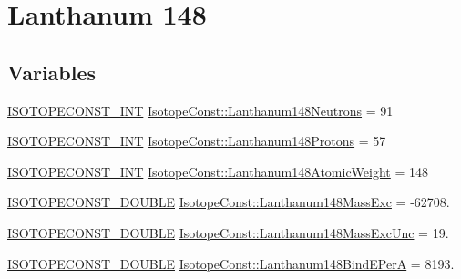 \hypertarget{group___isotope_const-_lanthanum-_la148}{}\section{Lanthanum 148}
\label{group___isotope_const-_lanthanum-_la148}
\subsection*{Variables}
\begin{DoxyCompactItemize}
\item 
\mbox{\hyperlink{group___isotope_const-_macros_ga5f18360b3e99483a35c32d789e62621c}{I\+S\+O\+T\+O\+P\+E\+C\+O\+N\+S\+T\+\_\+\+I\+NT}} \mbox{\hyperlink{group___isotope_const-_lanthanum-_la148_ga9b92a7258b10f0b59f1fd1bd5e867a75}{Isotope\+Const\+::\+Lanthanum148\+Neutrons}} = 91
\item 
\mbox{\hyperlink{group___isotope_const-_macros_ga5f18360b3e99483a35c32d789e62621c}{I\+S\+O\+T\+O\+P\+E\+C\+O\+N\+S\+T\+\_\+\+I\+NT}} \mbox{\hyperlink{group___isotope_const-_lanthanum-_la148_ga7ed66175a6c245f0605ebc61aa16052e}{Isotope\+Const\+::\+Lanthanum148\+Protons}} = 57
\item 
\mbox{\hyperlink{group___isotope_const-_macros_ga5f18360b3e99483a35c32d789e62621c}{I\+S\+O\+T\+O\+P\+E\+C\+O\+N\+S\+T\+\_\+\+I\+NT}} \mbox{\hyperlink{group___isotope_const-_lanthanum-_la148_ga813e64580b08be4a4ba6d1d8aec3b73d}{Isotope\+Const\+::\+Lanthanum148\+Atomic\+Weight}} = 148
\item 
\mbox{\hyperlink{group___isotope_const-_macros_ga8f45a7272ce02c0b4c65c44636ed719a}{I\+S\+O\+T\+O\+P\+E\+C\+O\+N\+S\+T\+\_\+\+D\+O\+U\+B\+LE}} \mbox{\hyperlink{group___isotope_const-_lanthanum-_la148_ga6b45ffb494f9e37c60971d890faf77c0}{Isotope\+Const\+::\+Lanthanum148\+Mass\+Exc}} = -\/62708.
\item 
\mbox{\hyperlink{group___isotope_const-_macros_ga8f45a7272ce02c0b4c65c44636ed719a}{I\+S\+O\+T\+O\+P\+E\+C\+O\+N\+S\+T\+\_\+\+D\+O\+U\+B\+LE}} \mbox{\hyperlink{group___isotope_const-_lanthanum-_la148_ga63e1c6afbf745fb07be0a1fd8e912446}{Isotope\+Const\+::\+Lanthanum148\+Mass\+Exc\+Unc}} = 19.
\item 
\mbox{\hyperlink{group___isotope_const-_macros_ga8f45a7272ce02c0b4c65c44636ed719a}{I\+S\+O\+T\+O\+P\+E\+C\+O\+N\+S\+T\+\_\+\+D\+O\+U\+B\+LE}} \mbox{\hyperlink{group___isotope_const-_lanthanum-_la148_gab303f054431a8c32c63f674e652cbbca}{Isotope\+Const\+::\+Lanthanum148\+Bind\+E\+PerA}} = 8193.
\item 

\end{DoxyCompactItemize}
